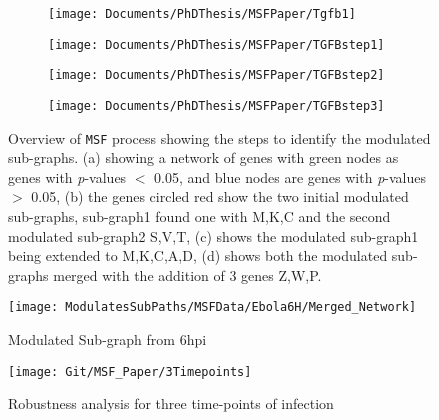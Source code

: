 \documentclass[twocolumn]{article}
\begin{document}
\begin{figure*}[ht!]
	
	\begin{subfigure}{.5\textwidth}
		\centering
		\texttt{[image: Documents/PhDThesis/MSFPaper/Tgfb1]} 
		\caption{}
	\end{subfigure}
	\begin{subfigure}{.5\textwidth}
		\centering
		\texttt{[image: Documents/PhDThesis/MSFPaper/TGFBstep1]}
		\caption{}
	\end{subfigure}
	\begin{subfigure}{.5\textwidth}
		\centering
		\texttt{[image: Documents/PhDThesis/MSFPaper/TGFBstep2]} 
		\caption{}
	\end{subfigure}
	\begin{subfigure}{.5\textwidth}
		\centering
		\texttt{[image: Documents/PhDThesis/MSFPaper/TGFBstep3]}
		\caption{}
	\end{subfigure}
	\caption{Overview of \texttt{MSF} process showing the steps to identify the modulated sub-graphs. (a) showing a network of genes with green nodes as genes with \textit{p}-values $< $ 0.05, and blue nodes are genes with \textit{p}-values $>$ 0.05, (b) the genes circled red show the two initial modulated sub-graphs, sub-graph1 found one with M,K,C and the second modulated sub-graph2 S,V,T, (c) shows the modulated sub-graph1 being extended to M,K,C,A,D, (d) shows both the modulated sub-graphs merged with the addition of 3 genes Z,W,P.}
\end{figure*}

\begin{figure*}
	\centering
	\texttt{[image: ModulatesSubPaths/MSFData/Ebola6H/Merged\_Network]}
	\caption{Modulated Sub-graph from 6hpi}
\end{figure*}


\begin{figure*}[p]
	\texttt{[image: Git/MSF\_Paper/3Timepoints]}
	\caption{Robustness analysis for three time-points of infection}
\end{figure*}
\end{document}
